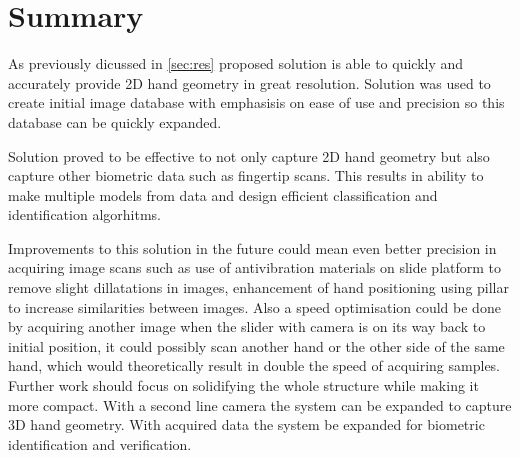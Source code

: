\documentclass[11pt,a4paper]{article}
\begin{document}
\newpage

\section{Summary}
\label{sec:sum}
As previously dicussed in \ref{sec:res} proposed solution is able to quickly and accurately provide 2D hand geometry in great resolution. Solution was
used to create initial image database with emphasisis on ease of use and precision so this database can be quickly expanded.

Solution proved to be effective to not only capture 2D hand geometry but also capture other biometric data such as fingertip scans. This results in
ability to make multiple models from data and design efficient classification and identification algorhitms.

Improvements to this solution in the future could mean even better precision in acquiring image scans such as use of antivibration materials on
slide platform to remove slight dillatations in images, enhancement of hand positioning using pillar to increase similarities between images.
Also a speed optimisation could be done by acquiring another image when the slider with camera is on its way back to initial position, it could possibly scan another hand or the other
side of the same hand, which would theoretically result in double the speed of acquiring samples.
Further work should focus on solidifying the whole structure while making it more compact.
With a second line camera the system can be expanded to capture 3D hand geometry. With acquired data the system be expanded for biometric identification and verification.
\end{document}
